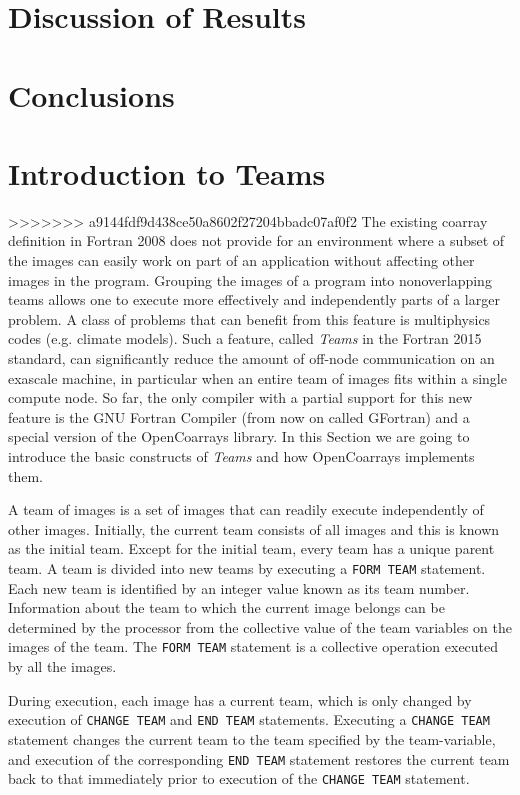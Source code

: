 \section{Discussion of Results}

\section{Conclusions}

\section{Introduction to Teams}\label{sec:teams}
>>>>>>> a9144fdf9d438ce50a8602f27204bbadc07af0f2
The existing coarray definition in Fortran 2008 does not provide for an environment
where a subset of the images can easily work on part of an application without affecting
other images in the program.  Grouping the images of a program into nonoverlapping
teams allows one to execute more effectively and independently parts of a larger
problem.  A class of problems that can benefit from this feature is multiphysics codes
(e.g.  climate models).
Such a feature, called \textit{Teams} in the Fortran 2015 standard, can significantly reduce the amount of off-node
communication on an exascale machine, in particular when an entire team of images
fits within a single compute node.
So far, the only compiler with a partial support for this new feature is the GNU Fortran Compiler (from now on
called GFortran) and a special version of the OpenCoarrays library.
In this Section we are going to introduce the basic constructs of \textit{Teams} and how OpenCoarrays implements them.

A team of images is a set of images that can readily execute independently of other images.
Initially, the current team consists of all images and this is
known as the initial team. Except for the initial team, every team has a unique parent team. A team is divided
into new teams by executing a \texttt{FORM TEAM} statement.
Each new team is identified by an integer value known
as its team number. Information about the team to which the current image belongs can be determined by the
processor from the collective value of the team variables on the images of the team.
The \texttt{FORM TEAM} statement is a collective operation executed by all the images.

During execution, each image has a current team, which is only changed by execution of \texttt{CHANGE TEAM} and
\texttt{END TEAM} statements. Executing a \texttt{CHANGE TEAM} statement changes the current team to the team specified
by the team-variable, and execution of the corresponding \texttt{END TEAM} statement restores the current team back
to that immediately prior to execution of the \texttt{CHANGE TEAM} statement.

